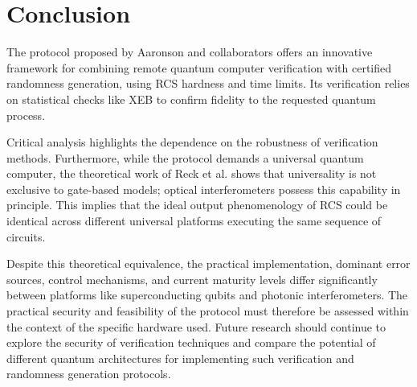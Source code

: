 \documentclass[11pt, a4paper]{article}
\begin{document}
\section{Conclusion}

The protocol proposed by Aaronson and collaborators offers an innovative framework for combining remote quantum computer verification with certified randomness generation, using RCS hardness and time limits. Its verification relies on statistical checks like XEB to confirm fidelity to the requested quantum process.

Critical analysis highlights the dependence on the robustness of verification methods. Furthermore, while the protocol demands a universal quantum computer, the theoretical work of Reck et al. \cite{ReckZeilinger} shows that universality is not exclusive to gate-based models; optical interferometers possess this capability in principle. This implies that the ideal output phenomenology of RCS could be identical across different universal platforms executing the same sequence of circuits.

Despite this theoretical equivalence, the practical implementation, dominant error sources, control mechanisms, and current maturity levels differ significantly between platforms like superconducting qubits and photonic interferometers. The practical security and feasibility of the protocol must therefore be assessed within the context of the specific hardware used. Future research should continue to explore the security of verification techniques and compare the potential of different quantum architectures for implementing such verification and randomness generation protocols.
\end{document}
